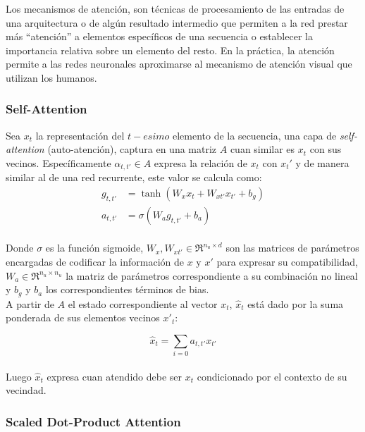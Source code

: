 	Los mecanismos de atención, son técnicas de procesamiento de las entradas de una arquitectura o de algún resultado intermedio que permiten a la red prestar más ``atención'' a elementos específicos de una secuencia o establecer la importancia relativa sobre un elemento del resto. En la práctica, la atención permite a las redes neuronales aproximarse al mecanismo de atención visual que utilizan los humanos.

	\subsubsection{Self-Attention}
	
		Sea $x_t$ la representación del $t-esimo$ elemento de la secuencia, una capa de \textit{self-attention} (auto-atención), captura en una matriz $A$ cuan similar es $x_t$ con sus vecinos. Específicamente $\alpha_{t, t'} \in A$ expresa la relación de $x_t$ con $x_t'$ y de manera similar al de una red recurrente, este valor se calcula como:
		\begin{equation}
			\begin{split}
				g_{t, t'} &= \tanh(W_{x}x_t + W_{x{t'}}x_{t'} + b_g)\\
				a_{t, t'} &= \sigma({W_{a}g_{t, t'} + b_{a}}) 
			\end{split}
		\end{equation}
		\\
		Donde $\sigma$ es la función sigmoide, $W_{x}, W_{x{t'}} \in \Re^{n_u \times d} $ son las matrices de parámetros encargadas de codificar la información de $x \text{ y } x'$ para expresar su compatibilidad, $W_a \in \Re^{n_u \times n_u}$ la matriz de parámetros correspondiente a su combinación no lineal y $b_g \text{ y } b_a$ los correspondientes términos de bias.
		\\
		A partir de $A$ el estado correspondiente al vector $x_t$, $\hat{x}_t$ está dado por la suma ponderada de sus elementos vecinos $x'_t$:
		
		\begin{equation} \label{attention}
			\hat{x}_t = \sum \limits_{i=0} a_{t,t'}x_{t'}
		\end{equation}
		\\
		Luego $\hat{x}_t$ expresa cuan atendido debe ser $x_t$ condicionado por el contexto de su vecindad.
	
	\subsubsection{Scaled Dot-Product Attention}
		
